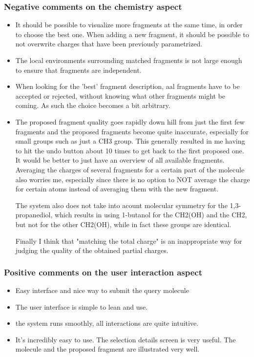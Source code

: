\subsubsection{Negative comments on the chemistry aspect}
\begin{itemize}
\item It should be possible to visualize more fragments at the same time, in order to choose the best one. When adding a new fragment, it should be possible to not overwrite charges that have been previously parametrized.

\item The local environments surrounding matched fragments is not large enough to ensure that fragments are independent. 

\item When looking for the 'best' fragment description, aal fragments have to be accepted or rejected, without knowing what other fragments might be coming. As such the choice becomes a bit arbitrary.

\item The proposed fragment quality goes rapidly down hill from just the first few fragments and the proposed fragments become quite inaccurate, especially for small groups such as just a CH3 group. This generally resulted in me having to hit the undo button about 10 times to get back to the first proposed one. It would be better to just have an overview of all available fragments. Averaging the charges of several fragments for a certain part of the molecule also worries me, especially since there is no option to NOT average the charge for certain atoms instead of averaging them with the new fragment.



The system also does not take into acount molecular symmetry for the 1,3-propanediol, which results in using 1-butanol for the CH2(OH) and the CH2, but not for the other CH2(OH), while in fact these groups are identical. 



Finally I think that "matching the total charge" is an inappropriate way for judging the quality of the obtained partial charges.

\end{itemize}


\subsubsection{Positive comments on the user interaction aspect}
\begin{itemize}
\item Easy interface and nice way to submit the query molecule

\item The user interface is simple to lean and use. 

\item the system runs smoothly, all interactions are quite intuitive.

\item It's incredibly easy to use. The selection details screen is very useful. The molecule and the proposed fragment are illustrated very well.

\end{itemize}


